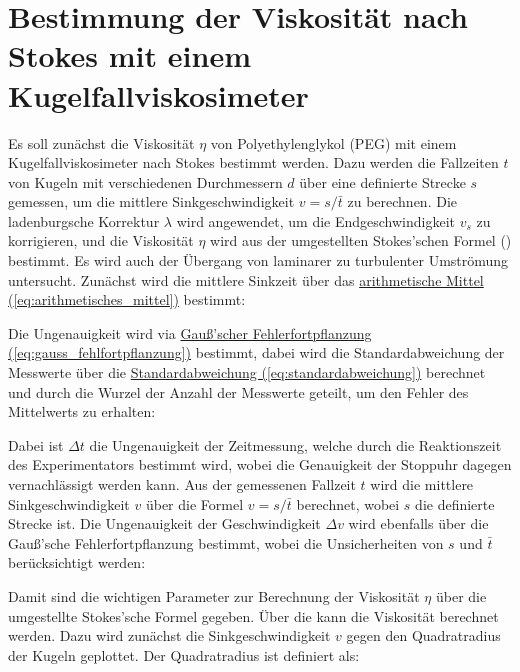 \newpage\newpage

\section{Bestimmung der Viskosität nach Stokes mit einem Kugelfallviskosimeter}
\label{sec:A1}

Es soll zunächst die Viskosität \(\eta\) von Polyethylenglykol (PEG) mit einem Kugelfallviskosimeter nach Stokes bestimmt werden. Dazu werden die Fallzeiten \(t\) von Kugeln mit verschiedenen Durchmessern \(d\) über eine definierte Strecke \(s\) gemessen, um die mittlere Sinkgeschwindigkeit \(v = s/\bar{t}\) zu berechnen. Die ladenburgsche Korrektur \(\lambda\) wird angewendet, um die Endgeschwindigkeit \(v_s\) zu korrigieren, und die Viskosität \(\eta\) wird aus der umgestellten Stokes'schen Formel () bestimmt. Es wird auch der Übergang von laminarer zu turbulenter Umströmung untersucht.
Zunächst wird die mittlere Sinkzeit über das \hyperref[eq:arithmetisches_mittel]{arithmetische Mittel (\ref*{eq:arithmetisches_mittel})} bestimmt:


Die Ungenauigkeit wird via \hyperref[eq:gauss_fehlfortpflanzung]{Gauß'scher Fehlerfortpflanzung (\ref*{eq:gauss_fehlfortpflanzung})} bestimmt, dabei wird die Standardabweichung der Messwerte über die \hyperref[eq:standardabweichung]{Standardabweichung (\ref*{eq:standardabweichung})} berechnet und durch die Wurzel der Anzahl der Messwerte geteilt, um den Fehler des Mittelwerts zu erhalten:

Dabei ist \(\Delta t\) die Ungenauigkeit der Zeitmessung, welche durch die Reaktionszeit des Experimentators bestimmt wird, wobei die Genauigkeit der Stoppuhr dagegen vernachlässigt werden kann.
Aus der gemessenen Fallzeit \(t\) wird die mittlere Sinkgeschwindigkeit \(v\) über die Formel \(v = s/\bar{t}\) berechnet, wobei \(s\) die definierte Strecke ist. Die Ungenauigkeit der Geschwindigkeit \(\Delta v\) wird ebenfalls über die Gauß'sche Fehlerfortpflanzung bestimmt, wobei die Unsicherheiten von \(s\) und \(\bar{t}\) berücksichtigt werden:

Damit sind die wichtigen Parameter zur Berechnung der Viskosität \(\eta\) über die umgestellte Stokes'sche Formel gegeben. Über die  kann die Viskosität berechnet werden. Dazu wird zunächst die Sinkgeschwindigkeit \(v\) gegen den Quadratradius der Kugeln geplottet. Der Quadratradius ist definiert als:

